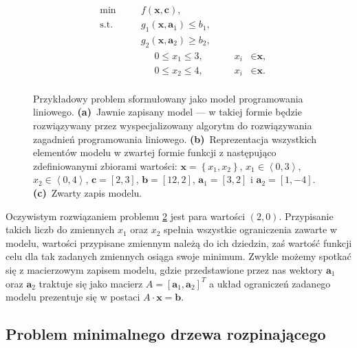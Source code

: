 \begin{figure}[!htbp]
\begin{subfigure}[b]{0.3\textwidth}
\begin{subequations}
\begin{alignat*}{4}
			& \text{min} & & f \left( \textbf{x}, \textbf{c} \right)\textrm{,} &&&\\
			& \text{s.t.} & \quad & g_{1} \left( \textbf{x}, \textbf{a}_{1} \right) \leqslant b_{1}\textrm{,} &&&\\
			& & \quad & g_{2} \left( \textbf{x}, \textbf{a}_{2} \right) \geqslant b_{2}\textrm{,} &&&\\
			& & & \phantom{\sum} 0 \leqslant x_{1} \leqslant 3, &\quad & x_{i} &\in \textbf{x}\textrm{,} \\
			& & & \phantom{\sum} 0 \leqslant x_{2} \leqslant 4, &\quad & x_{i} &\in \textbf{x}\textrm{.} \\
			\end{alignat*}
		\end{subequations}
		\caption{}
		\label{fig:lpexample:c}
	\end{subfigure}
	\hfill\null
	\caption{
		Przykładowy problem sformułowany jako model programowania liniowego.
		\textbf{(a)}~Jawnie zapisany model --- w takiej formie będzie rozwiązywany przez wyspecjalizowany algorytm do rozwiązywania zagadnień programowania liniowego.
		\textbf{(b)}~Reprezentacja wszystkich elementów modelu w zwartej formie funkcji z następująco zdefiniowanymi zbiorami wartości: $\textbf{x} = \left\{ x_{1}, x_{2} \right\}$, $x_{1} \in \left\langle 0, 3 \right\rangle$, $x_{2} \in \left\langle 0, 4 \right\rangle$, $\textbf{c} = \left[ 2, 3 \right]$, $\textbf{b} = \left[ 12, 2 \right]$, $\textbf{a}_{1} = \left[ 3, 2 \right]$ i $\textbf{a}_{2} = \left[ 1, -4 \right]$.
		\textbf{(c)}~Zwarty zapis modelu.
	}
	\label{fig:lpexample}
\end{figure}

Oczywistym rozwiązaniem problemu \ref{fig:lpexample} jest para wartości $\left( 2, 0 \right)$. Przypisanie takich liczb do zmiennych $x_{1}$ oraz $x_{2}$ spełnia wszystkie ograniczenia zawarte w modelu, wartości przypisane zmiennym należą do ich dziedzin, zaś wartość funkcji celu dla tak zadanych zmiennych osiąga swoje minimum. Zwykle możemy spotkać się z macierzowym zapisem modelu, gdzie przedstawione przez nas wektory $\textbf{a}_{1}$ oraz $\textbf{a}_{2}$ traktuje się jako macierz $A = \left[ \textbf{a}_{1}, \textbf{a}_{2} \right]^{T}$ a układ ograniczeń zadanego modelu prezentuje się w postaci $A \cdot \textbf{x} = \textbf{b}$.

\subsection{Problem minimalnego drzewa rozpinającego}

